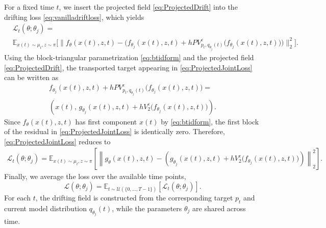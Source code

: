 \documentclass[10pt,a4paper]{amsart}
\begin{document}
For a fixed time $t$, we insert the projected field
    \eqref{eq:ProjectedDrift} into the drifting loss
    \eqref{eq:vanilladriftloss}, which yields
    \begin{align}
        &\mathcal{L}_t(\theta;\theta_j)
        = 
        \\ &\mathbb{E}_{x(t)\sim\mu_t,z\sim\pi}
        \Big[
        \big\|
            f_{\theta}(x(t),z,t)
            -
            \big(
                f_{\theta_j}(x(t),z,t)
                +
                hP V_{p_t,q_{\theta_j}(t)}^{\varepsilon}
                \big(
                    f_{\theta_j}(x(t),z,t)
                \big)
            \big)
        \big\|_2^2
        \Big]. \nonumber
        \label{eq:ProjectedJointLoss}
    \end{align}
Using the block-triangular parametrization
    \eqref{eq:btidform} and the projected field
    \eqref{eq:ProjectedDrift}, the transported target appearing in
    \eqref{eq:ProjectedJointLoss} can be written as
    \begin{multline}
        f_{\theta_j}(x(t),z,t)
        +
        hP V_{p_t,q_{\theta_j}(t)}^{\varepsilon}
        \big(
            f_{\theta_j}(x(t),z,t)
        \big)
        =\\
        \left(
            x(t),\,
            g_{\theta_j}(x(t),z,t)
            +
            hV_2^{\varepsilon}
            \big(
                f_{\theta_j}(x(t),z,t)
            \big)
        \right).
    \end{multline}
Since $f_{\theta}(x(t),z,t)$ has first component $x(t)$ by
    \eqref{eq:btidform}, the first block of the residual in
    \eqref{eq:ProjectedJointLoss} is identically zero. Therefore,
    \eqref{eq:ProjectedJointLoss} reduces to
    \begin{align}
        \mathcal{L}_t(\theta;\theta_j)
        =
        \mathbb{E}_{x(t)\sim\mu_t,z\sim\pi}
        \left[
        \left\|
            g_{\theta}(x(t),z,t)
            -
            \left(
                g_{\theta_j}(x(t),z,t)
                +
                hV_2^{\varepsilon}
                \big(
                    f_{\theta_j}(x(t),z,t)
                \big)
            \right)
        \right\|_2^2
        \right].
        \label{eq:ConditionalDriftLoss}
    \end{align}
Finally, we average the loss over the available time points,
\begin{equation}\label{eq:ProjectedLoss}
        \mathcal{L}(\theta;\theta_j)
        =
        \mathbb{E}_{t\sim\mathcal{U}(\{0,\ldots,T-1\})}
        \left[
\mathcal{L}_t(\theta;\theta_j)
        \right].
    \end{equation}
For each $t$, the drifting field is constructed from the
    corresponding target $p_t$ and current model distribution
    $q_{\theta_j}(t)$, while the parameters $\theta_j$ are shared across time.
\end{document}

